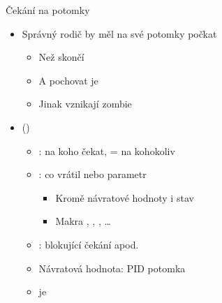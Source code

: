 \begin{frame}{Čekání na potomky}

  \begin{itemize}
    \item Správný rodič by měl na své potomky počkat
    \begin{itemize}
      \item Než skončí
      \item A pochovat je
      \item Jinak vznikají zombie
    \end{itemize}

    \pause

    \item { \footnotesize {} () }
    \begin{itemize}
      \item {}: na koho čekat,  = na kohokoliv

      \pause

      \item {}: co vrátil  nebo parametr 
      \begin{itemize}
	\item Kromě návratové hodnoty i stav
	\item Makra , , ,
	  \dots
      \end{itemize}

      \pause

      \item {}: blokující čekání apod.
      \item Návratová hodnota: PID potomka

      \pause

      \item {} je 
    \end{itemize}

  \end{itemize}

\end{frame}

